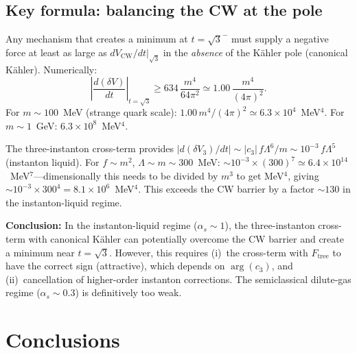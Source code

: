 \subsection{Key formula: balancing the CW at the pole}

Any mechanism that creates a minimum at $t = \sqrt{3}^-$ must supply a negative
force at least as large as $dV_{\text{CW}}/dt|_{\sqrt{3}}$ in the \emph{absence}
of the K\"ahler pole (canonical K\"ahler). Numerically:
\begin{equation}
\left|\frac{d(\delta V)}{dt}\right|_{t=\sqrt{3}} \geq 634\,\frac{m^4}{64\pi^2}
\simeq 1.00\,\frac{m^4}{(4\pi)^2}.
\end{equation}
For $m \sim 100$~MeV (strange quark scale): $1.00\,m^4/(4\pi)^2 \simeq 6.3 \times 10^4$~MeV$^4$.
For $m \sim 1$~GeV: $6.3 \times 10^8$~MeV$^4$.

The three-instanton cross-term provides $|d(\delta V_3)/dt| \sim |c_3|\,f\Lambda^6/m
\sim 10^{-3}\,f\Lambda^5$ (instanton liquid). For $f \sim m^2$, $\Lambda \sim m \sim 300$~MeV:
$\sim 10^{-3} \times (300)^7 \simeq 6.4 \times 10^{14}$~MeV$^7$---dimensionally this needs
to be divided by $m^3$ to get MeV$^4$, giving $\sim 10^{-3} \times 300^4 = 8.1 \times 10^6$~MeV$^4$.
This exceeds the CW barrier by a factor $\sim 130$ in the instanton-liquid regime.

\textbf{Conclusion:} In the instanton-liquid regime ($\alpha_s \sim 1$), the three-instanton
cross-term with canonical K\"ahler can potentially overcome the CW barrier and create
a minimum near $t = \sqrt{3}$. However, this requires
(i)~the cross-term with $F_{\text{tree}}$ to have the correct sign (attractive),
which depends on $\arg(c_3)$, and (ii)~cancellation of higher-order instanton corrections.
The semiclassical dilute-gas regime ($\alpha_s \sim 0.3$) is definitively too weak.


\section{Conclusions}

